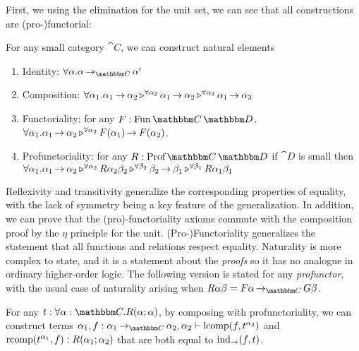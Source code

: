 \documentclass{llncs}
\begin{document}
First, we using the elimination for the unit set, we can see that all
constructions are (pro-)functorial:
\begin{construction}
  For any small category $\cat C$, we can construct natural elements
  \begin{enumerate}
  \item Identity: $\pendallXdotY {\alpha} {\punitinXfromYtoZ {\cat C}{\alpha}{\alpha'}}$
  \item Composition: $\forall \alpha_1. \alpha_1 \mathop{\to_{}} \alpha_2 \mathop{\triangleright^{\forall \alpha_2}} \alpha_1 \mathop{\to_{}} \alpha_2 \mathop{\triangleright^{\forall \alpha_3}} \alpha_1 \mathop{\to_{}} \alpha_3$
  \item Functoriality: for any $F : \varr {\cat C}{\cat D}$, $\forall \alpha_1. \alpha_1 \mathop{\to_{}} \alpha_2 \mathop{\triangleright^{\forall \alpha_2}} F(\alpha_1) \mathop{\to_{}} F(\alpha_2)$.
   \item Profunctoriality: for any $R : \harr {\cat C}{\cat D}$ if
     $\cat D$ is small then \\ $\forall \alpha_1. \alpha_1 \mathop{\to_{}} \alpha_2 \mathop{\triangleright^{\forall \alpha_2}} R{\alpha_2}{\beta_2} \mathop{\triangleright^{\forall \beta_2}} \beta_2 \mathop{\to_{}} \beta_1 \mathop{\triangleright^{\forall \beta_1}} R\alpha_1\beta_1$
  \end{enumerate}
\end{construction}
Reflexivity and transitivity generalize the corresponding properties
of equality, with the lack of symmetry being a key feature of the
generalization.
%
In addition, we can prove that the (pro)-functoriality axioms commute
with the composition proof by the $\eta$ principle for the unit.
%
(Pro-)Functoriality generalizes the statement that all functions and
relations respect equality.
%
Naturality is more complex to state, and it is a statement about the
\emph{proofs} so it has no analogue in ordinary higher-order
logic. The following version is stated for any \emph{profunctor}, with
the usual case of naturality arising when $R \alpha \beta =
\punitinXfromYtoZ {\cat C}{F \alpha}{G \beta}$.
\begin{lemma}[Naturality]
  For any $t : \pendallXdotY {\alpha:\cat C}{\harrapp R \alpha
    \alpha}$, by composing with profunctoriality, we can construct
  terms $\alpha_1, f : \punitinXfromYtoZ {\cat C} {\alpha_1}
  {\alpha_2}, \alpha_2 \vdash \textrm{lcomp}(f,\pendappXtoY t
  {\alpha_2})$ and $\textrm{rcomp}(t^{\alpha_1}, f) :
  R(\alpha_1;\alpha_2)$ that are both equal to
  $\textrm{ind}_{\to}(f,t)$.
\end{lemma}
\end{document}
